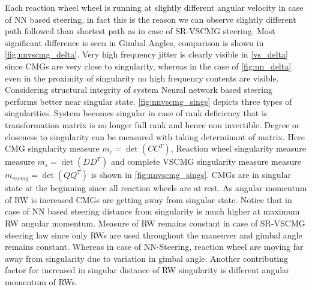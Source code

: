 \noindent Each reaction wheel wheel is running at slightly different angular velocity in case of NN based steering, in fact this is the reason we can observe slightly different path followed than shortest path as in case of SR-VSCMG steering.
Most significant difference is  seen in Gimbal Angles, comparison is shown in \autoref{fig:nnvscmg_delta}. Very high frequency jitter is clearly visible in \autoref{vs_delta} since CMGs are very close to singularity, whereas in the case of \autoref{fig:nn_delta} even in the proximity of singularity no high frequency contents are visible. Considering structural integrity of system Neural network based steering performs better near singular state.
\autoref{fig:nnvscmg_sings} depicts three types of singularities. System becomes singular in case of rank deficiency that is transformation matrix is no longer full rank and hence non invertible. Degree or closeness to singularity can be measured with taking determinant of matrix. Here CMG singularity measure $m_c = \det(CC^T)$, Reaction wheel singularity measure measure $m_s = \det(DD^T)$ and complete VSCMG singularity measure measure $m_{vscmg} = \det(QQ^T)$ is shown in \autoref{fig:nnvscmg_sings}. CMGs are in singular state at the beginning since all reaction wheels are at rest. As angular momentum of RW is increased CMGs are getting away from singular state. Notice that in case of NN based steering distance from singularity is much higher at maximum RW angular momentum. Measure of RW remains constant in case of SR-VSCMG steering law since only RWs are used throughout the maneuver and gimbal angle remains constant. Whereas in case of NN-Steering, reaction wheel are moving far away from singularity due to variation in gimbal angle. Another contributing factor for increased in singular distance of RW singularity is different angular momentum of RWs. 

